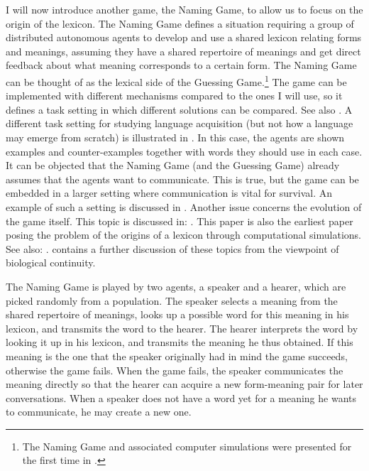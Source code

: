 I will now introduce another game, the Naming
Game, to allow us to focus on the origin of the lexicon.
The Naming Game defines a situation requiring 
a group of distributed autonomous agents to develop and 
use a shared lexicon relating forms and meanings, 
assuming they have a shared repertoire of meanings and get 
direct feedback about what meaning corresponds to a
certain form. The Naming Game can be thought of 
as the lexical side of the Guessing Game.\footnote{
The Naming Game and associated computer simulations
were presented for the first time in \cite{Steels:1996a}.}
The game can be implemented with different
mechanisms compared to the ones I will use, so it defines a 
task setting in which different solutions can be compared. 
See also \cite{Hutchins:1995}.
A different task setting for studying language acquisition
(but not how a language may emerge from scratch) is 
illustrated in \cite{Regier:1996}. In this case, the agents
are shown examples and counter-examples together with 
words they should use in each case. 
\newline 
It can be objected
that the Naming Game (and the Guessing Game) already 
assumes that the agents want to communicate. 
This is true, but the game can be embedded in a larger
setting where communication is vital for survival. 
An example of such a setting is discussed in \cite{Werner:1991}. \newline
Another issue concerns
the evolution of the game itself. This topic is discussed in: 
\cite{Hurford:1989}. This paper is also
the earliest paper posing the problem of the origins of 
a lexicon through computational simulations. See also: 
\cite{Oliphant:1996}. \cite{Hauser:1996}
contains a further discussion of these topics from the 
viewpoint of biological continuity.

The Naming Game is played by two agents, a speaker and 
a hearer, which are picked randomly from a population. 
The speaker selects a meaning from the shared repertoire
of meanings, looks up a possible word for this meaning 
in his lexicon, and transmits the word to the hearer. 
The hearer interprets the word by looking it up in his lexicon, 
and transmits the meaning he thus obtained. If this meaning 
is the one that the speaker originally had in mind the 
game succeeds, otherwise the game fails. When the game 
fails, the speaker communicates the meaning directly so 
that the hearer can acquire a new form-meaning pair 
for later conversations. When a speaker does not have a
word yet for a meaning he wants to communicate, he may create 
a new one. 

